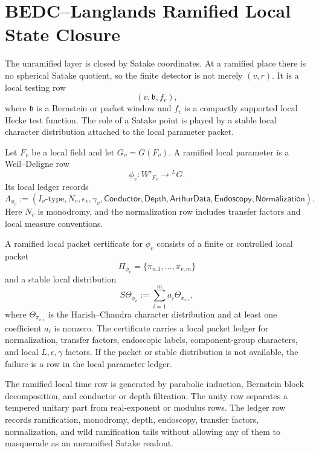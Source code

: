 \section{BEDC--Langlands Ramified Local State Closure}
\label{sec:unified-reality-bedc-langlands-ramified-local-state-closure}

The unramified layer is closed by Satake coordinates. At a ramified
place there is no spherical Satake quotient, so the finite detector is
not merely $(v,r)$. It is a local testing row
$$
(v,\mathfrak b,f_v),
$$
where $\mathfrak b$ is a Bernstein or packet window and $f_v$ is a
compactly supported local Hecke test function. The role of a Satake
point is played by a stable local character distribution attached to the
local parameter packet.

\begin{definition}
\label{def:unified-reality-ramified-local-parameter-ledger}
Let $F_v$ be a local field and let $G_v=G(F_v)$. A ramified local
parameter is a Weil--Deligne row
$$
\phi_v:W'_{F_v}\to{}^LG.
$$
Its local ledger records
$$
\Lambda_{\phi_v}
:=
(I_v\text{-type},N_v,\epsilon_v,\gamma_v,
\mathsf{Conductor},\mathsf{Depth},\mathsf{ArthurData},
\mathsf{Endoscopy},\mathsf{Normalization}).
$$
Here $N_v$ is monodromy, and the normalization row includes transfer
factors and local measure conventions.
\end{definition}

\begin{definition}
\label{def:unified-reality-ramified-local-packet-certificate}
A ramified local packet certificate for $\phi_v$ consists of a finite or
controlled local packet
$$
\Pi_{\phi_v}=\{\pi_{v,1},\ldots,\pi_{v,m}\}
$$
and a stable local distribution
$$
S\Theta_{\phi_v}
:=
\sum_{i=1}^{m}a_i\Theta_{\pi_{v,i}},
$$
where $\Theta_{\pi_{v,i}}$ is the Harish--Chandra character
distribution and at least one coefficient $a_i$ is nonzero. The
certificate carries a local packet ledger for normalization, transfer
factors, endoscopic labels, component-group characters, and local
$L,\epsilon,\gamma$ factors. If the packet or stable distribution is not
available, the failure is a row in the local parameter ledger.
\end{definition}

\begin{definition}
\label{def:unified-reality-ramified-local-three-properties}
The ramified local time row is generated by parabolic induction,
Bernstein block decomposition, and conductor or depth filtration. The
unity row separates a tempered unitary part from real-exponent or
modulus rows. The ledger row records ramification, monodromy, depth,
endoscopy, transfer factors, normalization, and wild ramification tails
without allowing any of them to masquerade as an unramified Satake
readout.
\end{definition}

